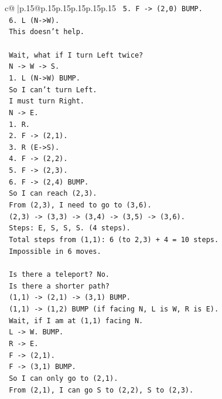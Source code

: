 \documentclass{article}
\begin{document}
{\begin{supertabular}{c@{$\;$}|p{.15\linewidth}@{}p{.15\linewidth}p{.15\linewidth}p{.15\linewidth}p{.15\linewidth}p{.15\linewidth}}
{{{\texttt{   5. F {-}> (2,0) BUMP.} \\
\texttt{   6. L (N{-}>W).} \\
\texttt{   This doesn't help.} \\
\\ 
\texttt{   Wait, what if I turn Left twice?} \\
\texttt{   N {-}> W {-}> S.} \\
\texttt{   1. L (N{-}>W) BUMP.} \\
\texttt{   So I can't turn Left.} \\
\texttt{   I must turn Right.} \\
\texttt{   N {-}> E.} \\
\texttt{   1. R.} \\
\texttt{   2. F {-}> (2,1).} \\
\texttt{   3. R (E{-}>S).} \\
\texttt{   4. F {-}> (2,2).} \\
\texttt{   5. F {-}> (2,3).} \\
\texttt{   6. F {-}> (2,4) BUMP.} \\
\texttt{   So I can reach (2,3).} \\
\texttt{   From (2,3), I need to go to (3,6).} \\
\texttt{   (2,3) {-}> (3,3) {-}> (3,4) {-}> (3,5) {-}> (3,6).} \\
\texttt{   Steps: E, S, S, S. (4 steps).} \\
\texttt{   Total steps from (1,1): 6 (to 2,3) + 4 = 10 steps.} \\
\texttt{   Impossible in 6 moves.} \\
\\ 
\texttt{   Is there a teleport? No.} \\
\texttt{   Is there a shorter path?} \\
\texttt{   (1,1) {-}> (2,1) {-}> (3,1) BUMP.} \\
\texttt{   (1,1) {-}> (1,2) BUMP (if facing N, L is W, R is E).} \\
\texttt{   Wait, if I am at (1,1) facing N.} \\
\texttt{   L {-}> W. BUMP.} \\
\texttt{   R {-}> E.} \\
\texttt{   F {-}> (2,1).} \\
\texttt{   F {-}> (3,1) BUMP.} \\
\texttt{   So I can only go to (2,1).} \\
\texttt{   From (2,1), I can go S to (2,2), S to (2,3).} \\
}}}
\end{supertabular}}
\end{document}
